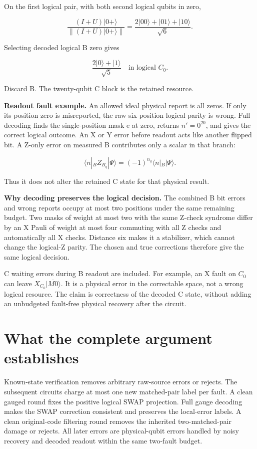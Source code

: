 \documentclass[11pt]{article}
\begin{document}
On the first logical pair, with both second logical qubits in zero,

\[
\frac{(I+U)|0+\rangle}{\|(I+U)|0+\rangle\|}
=\frac{2|00\rangle+|01\rangle+|10\rangle}{\sqrt6}.
\]

Selecting decoded logical B zero gives

\[
\frac{2|0\rangle+|1\rangle}{\sqrt5}\quad\text{in logical }C_0.
\]

Discard B. The twenty-qubit C block is the retained resource.

\textbf{Readout fault example.} An allowed ideal physical report is all zeros. If only its position zero is misreported, the raw six-position logical parity is wrong. Full decoding finds the single-position mask e at zero, returns \(n'=0^{20}\), and gives the correct logical outcome. An X or Y error before readout acts like another flipped bit. A Z-only error on measured B contributes only a scalar in that branch:

\[
\langle n|_B Z_{B_q}|\Psi\rangle=(-1)^{n_q}\langle n|_B|\Psi\rangle.
\]

Thus it does not alter the retained C state for that physical result.

\textbf{Why decoding preserves the logical decision.} The combined B bit errors and wrong reports occupy at most two positions under the same remaining budget. Two masks of weight at most two with the same Z-check syndrome differ by an X Pauli of weight at most four commuting with all Z checks and automatically all X checks. Distance six makes it a stabilizer, which cannot change the logical-Z parity. The chosen and true corrections therefore give the same logical decision.

C waiting errors during B readout are included. For example, an X fault on \(C_0\) can leave \(X_{C_0}|\overline{M0}\rangle\). It is a physical error in the correctable space, not a wrong logical resource. The claim is correctness of the decoded C state, without adding an unbudgeted fault-free physical recovery after the circuit.

\section{What the complete argument establishes}
Known-state verification removes arbitrary raw-source errors or rejects. The subsequent circuits charge at most one new matched-pair label per fault. A clean gauged round fixes the positive logical SWAP projection. Full gauge decoding makes the SWAP correction consistent and preserves the local-error labels. A clean original-code filtering round removes the inherited two-matched-pair damage or rejects. All later errors are physical-qubit errors handled by noisy recovery and decoded readout within the same two-fault budget.
\end{document}
